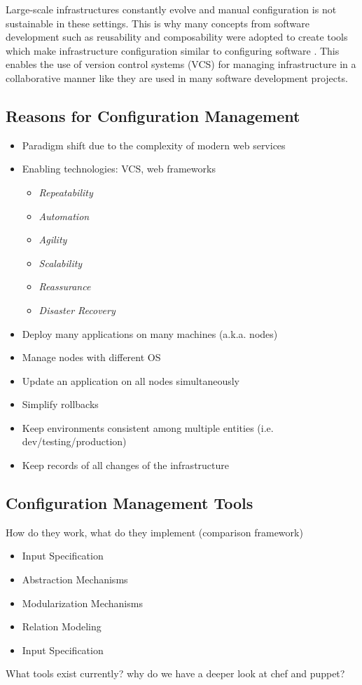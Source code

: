 Large-scale infrastructures constantly evolve and manual configuration is not sustainable in these settings. This is why many concepts from software development such as reusability and composability were adopted to create tools which make infrastructure configuration similar to configuring software \cite{kanies2006puppet}. This enables the use of version control systems (VCS) for managing infrastructure in a collaborative manner like they are used in many software development projects.

\subsection{Reasons for Configuration Management}

	\begin{itemize}
		\item Paradigm shift due to the complexity of modern web services
		\item Enabling technologies: VCS, web frameworks
			\begin{itemize}
			\item \textit{Repeatability}
			\item \textit{Automation}
			\item \textit{Agility}
			\item \textit{Scalability}
			\item \textit{Reassurance}
			\item \textit{Disaster Recovery}
			\end{itemize}
	\end{itemize}


	\begin{itemize}
		\item Deploy many applications on many machines (a.k.a. nodes)
		\item Manage nodes with different OS
		\item Update an application on all nodes simultaneously
		\item Simplify rollbacks
		\item Keep environments consistent among multiple entities (i.e. dev/testing/production)
		\item Keep records of all changes of the infrastructure
	\end{itemize}

\subsection{Configuration Management Tools}

How do they work, what do they implement (comparison framework)

	\begin{itemize}
	\item Input Specification
	\item Abstraction Mechanisms
	\item Modularization Mechanisms
	\item Relation Modeling
	\item Input Specification
	\end{itemize}


What tools exist currently? why do we have a deeper look at chef and puppet?
